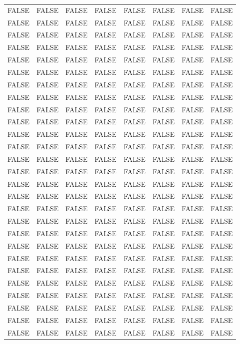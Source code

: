 \documentclass[11pt]{article}
\begin{document}
\begin{tabular}{llllllll}
	 FALSE & FALSE & FALSE & FALSE & FALSE & FALSE & FALSE & FALSE\\
	 FALSE & FALSE & FALSE & FALSE & FALSE & FALSE & FALSE & FALSE\\
	 FALSE & FALSE & FALSE & FALSE & FALSE & FALSE & FALSE & FALSE\\
	 FALSE & FALSE & FALSE & FALSE & FALSE & FALSE & FALSE & FALSE\\
	 FALSE & FALSE & FALSE & FALSE & FALSE & FALSE & FALSE & FALSE\\
	 FALSE & FALSE & FALSE & FALSE & FALSE & FALSE & FALSE & FALSE\\
	 FALSE & FALSE & FALSE & FALSE & FALSE & FALSE & FALSE & FALSE\\
	 FALSE & FALSE & FALSE & FALSE & FALSE & FALSE & FALSE & FALSE\\
	 FALSE & FALSE & FALSE & FALSE & FALSE & FALSE & FALSE & FALSE\\
	 FALSE & FALSE & FALSE & FALSE & FALSE & FALSE & FALSE & FALSE\\
	 FALSE & FALSE & FALSE & FALSE & FALSE & FALSE & FALSE & FALSE\\
	 FALSE & FALSE & FALSE & FALSE & FALSE & FALSE & FALSE & FALSE\\
	 FALSE & FALSE & FALSE & FALSE & FALSE & FALSE & FALSE & FALSE\\
	 FALSE & FALSE & FALSE & FALSE & FALSE & FALSE & FALSE & FALSE\\
	 FALSE & FALSE & FALSE & FALSE & FALSE & FALSE & FALSE & FALSE\\
	 FALSE & FALSE & FALSE & FALSE & FALSE & FALSE & FALSE & FALSE\\
	 FALSE & FALSE & FALSE & FALSE & FALSE & FALSE & FALSE & FALSE\\
	 FALSE & FALSE & FALSE & FALSE & FALSE & FALSE & FALSE & FALSE\\
	 FALSE & FALSE & FALSE & FALSE & FALSE & FALSE & FALSE & FALSE\\
	 FALSE & FALSE & FALSE & FALSE & FALSE & FALSE & FALSE & FALSE\\
	 FALSE & FALSE & FALSE & FALSE & FALSE & FALSE & FALSE & FALSE\\
	 FALSE & FALSE & FALSE & FALSE & FALSE & FALSE & FALSE & FALSE\\
	 FALSE & FALSE & FALSE & FALSE & FALSE & FALSE & FALSE & FALSE\\
	 FALSE & FALSE & FALSE & FALSE & FALSE & FALSE & FALSE & FALSE\\
	 FALSE & FALSE & FALSE & FALSE & FALSE & FALSE & FALSE & FALSE\\
	 FALSE & FALSE & FALSE & FALSE & FALSE & FALSE & FALSE & FALSE\\
	 FALSE & FALSE & FALSE & FALSE & FALSE & FALSE & FALSE & FALSE\\
\end{tabular}
\end{document}
